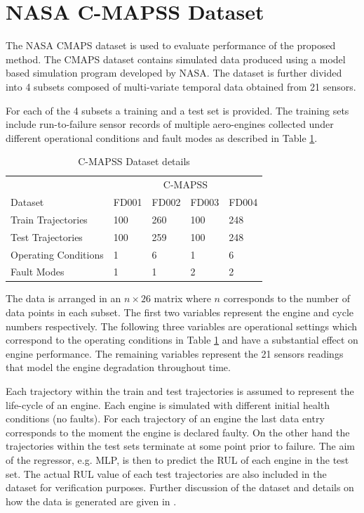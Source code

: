 \documentclass{article}
\begin{document}
\section{NASA C-MAPSS Dataset}
\label{sec:rul_dataset}

The NASA CMAPS dataset \cite{CMAPS2008} is used to evaluate performance of the proposed method. The CMAPS dataset contains simulated data produced using a model based simulation program developed by NASA. The dataset is further divided into 4 subsets composed of multi-variate temporal data obtained from 21 sensors.

For each of the 4 subsets a training and a test set is provided. The training sets include run-to-failure sensor records of multiple aero-engines collected under different operational conditions and fault modes as described in Table \ref{table:cmapss}.

\begin{table}[!htb]
\centering
\begin{tabular}{l | l l l l}
	\hline
	 & \multicolumn{4}{c}{C-MAPSS}\\  
	 Dataset & FD001 & FD002 & FD003 & FD004\\
  	\hline
  	Train Trajectories & 100 & 260 & 100 & 248\\
  	Test Trajectories & 100 & 259 & 100 & 248\\
  	Operating Conditions & 1 & 6 & 1 & 6\\
  	Fault Modes & 1 & 1 & 2 & 2\\
  	\hline
\end{tabular}
\caption{C-MAPSS Dataset details}
\label{table:cmapss}
\end{table}

The data is arranged in an $n\times26$ matrix where $n$ corresponds to the number of data points in each subset. The first two variables represent the engine and cycle numbers respectively. The following three variables are operational settings which correspond to the operating conditions in Table \ref{table:cmapss} and have a substantial effect on engine performance. The remaining variables represent the 21 sensors readings that model the engine degradation throughout time.

Each trajectory within the train and test trajectories is assumed to represent the life-cycle of an engine. Each engine is simulated with different initial health conditions (no faults). For each trajectory of an engine the last data entry corresponds to the moment the engine is declared faulty. On the other hand the trajectories within the test sets terminate at some point prior to failure. The aim of the regressor, e.g. MLP, is then to predict the RUL of each engine in the test set. The actual RUL value of each test trajectories are also included in the dataset for verification purposes. Further discussion of the dataset and details on how the data is generated are given in \cite{Saxena2008}.
\end{document}

